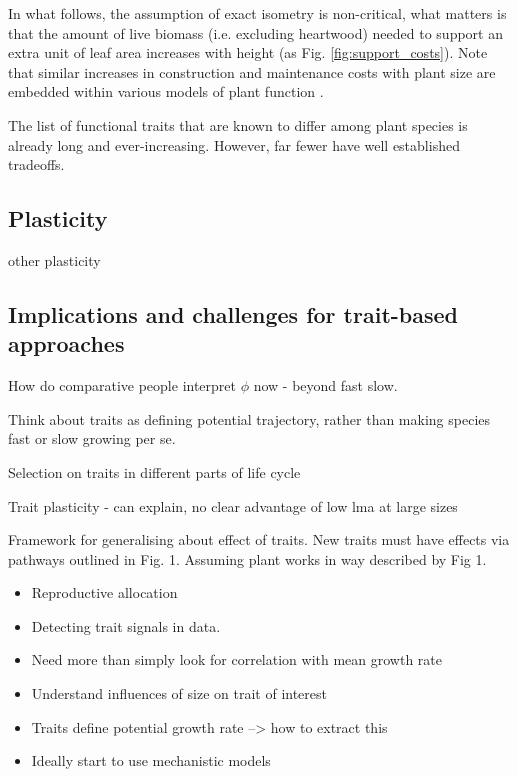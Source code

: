 \documentclass[a4paper,11pt]{article}
\begin{document}
In what follows, the assumption of exact isometry is non-critical, what matters is that the amount of live biomass (i.e. excluding heartwood) needed to support an extra unit of leaf area increases with height (as Fig. \ref{fig:support_costs}).  Note that similar increases in construction and maintenance costs with plant size are embedded within various models of plant function \citep[e.g.][]{Givnish-1988, Makela-1997}.


The list of functional traits that are known to differ among plant species is already long and ever-increasing. However, far fewer have well established tradeoffs.

\subsection{Plasticity}

other plasticity \citep{Thomas-2010}

\subsection{Implications and challenges for trait-based approaches}

How do comparative people interpret $\phi$ now - beyond fast slow.

Think about traits as defining potential trajectory, rather than making
species fast or slow growing per se.

Selection on traits in different parts of life cycle

Trait plasticity - can explain, no clear advantage of low lma at large
sizes

Framework for generalising about effect of traits. New traits must have effects via pathways outlined in Fig. 1. Assuming plant works in way described by Fig 1.

\begin{itemize}
\item Reproductive allocation
\item Detecting trait signals in data.
\item Need more than simply look for correlation with mean growth rate
\item Understand influences of size on trait of interest
\item Traits define potential growth rate --\textgreater{} how to extract
  this
\item Ideally start to use mechanistic models
\end{itemize}
\end{document}

